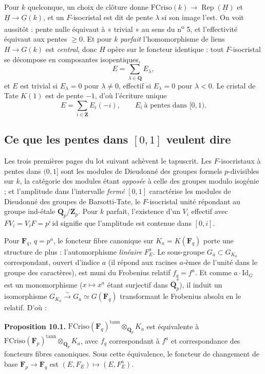\documentclass[11pt,a4paper]{article}
\begin{document}
Pour $k$ quelconque, un choix de clôture donne
$\mathrm{FCriso}(k) \to \operatorname{Rep}(\underline{H})$ et
$\underline{H} \to \underline{G}(k)$, et un $F$-isocristal est dit de pente
$\lambda$ si son image l'est. On voit aussitôt : pente nulle équivaut à
« trivial » au sens du n\textsuperscript{o} 5, et l'effectivité équivaut aux
pentes $\geqslant 0$. Et pour $k$ \emph{parfait} l'homomorphisme de liens
$H \to G(k)$ est \emph{central}, donc $H$ opère sur le foncteur identique :
tout $F$-isocristal se décompose en composantes isopentiques,
\[
E = \sum_{\lambda \in \mathbf{Q}} E_{\lambda} ,
\]
et $E$ est trivial si $E_{\lambda} = 0$ pour $\lambda \neq 0$, effectif si
$E_{\lambda} = 0$ pour $\lambda < 0$. Le cristal de Tate $K(1)$ est de pente
$-1$, d'où l'écriture unique
\[
E = \sum_{i \in \mathbf{Z}} E_{i}(-i) ,
\qquad E_{i} \ \text{à pentes dans } [0,1) .
\]

\subsection*{Ce que les pentes dans $[0,1]$ veulent dire}

Les trois premières pages du lot suivant achèvent le tapuscrit. Les
$F$-isocristaux à pentes dans $(0,1]$ sont les modules de Dieudonné
des groupes formels $p$-divisibles sur $k$, la catégorie des modules étant
\emph{opposée} à celle des groupes modulo isogénie ; et l'amplitude dans
l'intervalle \emph{fermé} $[0,1]$ caractérise les modules de Dieudonné des
groupes de Barsotti-Tate, le $F$-isocristal unité répondant au groupe ind-étale
$\mathbf{Q}_{p}/\mathbf{Z}_{p}$. Pour $k$ parfait, l'existence d'un $V_{i}$
effectif avec $FV_{i} = V_{i}F = p^{i}\,\mathrm{id}$ signifie que l'amplitude
est contenue dans $[0,i]$.

Pour $\mathbf{F}_{q}$, $q = p^{a}$, le foncteur fibre canonique sur
$K_{a} = K(\mathbf{F}_{q})$ porte une structure de plus : l'automorphisme
\emph{linéaire} $F_{E}^{a}$. Le sous-groupe $G_{a} \subset G_{K_{a}}$
correspondant, ouvert d'indice $a$ (il répond aux racines $a$-èmes de
l'unité dans le groupe des caractères), est muni du Frobenius relatif
$f_{q} = f^{a}$. Et comme $a \cdot \mathrm{Id}_{G}$ est un monomorphisme
($x \mapsto x^{a}$ étant surjectif dans $\bar{\mathbf{Q}}_{p}^{*}$), il induit
un isomorphisme $G_{K_{a}} \xrightarrow{\sim} G_{a} \simeq
G(\mathbf{F}_{q})$ transformant le Frobenius absolu en le relatif. D'où :

\textbf{Proposition 10.1.} $\mathrm{FCriso}(\mathbf{F}_{q})^{\mathrm{tann}}
\otimes_{\mathbf{Q}_{p}} K_{a}$ est équivalente à
$\mathrm{FCriso}(\mathbf{F}_{p})^{\mathrm{tann}} \otimes_{\mathbf{Q}_{p}}
K_{a}$, avec $f_{q}$ correspondant à $f^{a}$ et correspondance des foncteurs
fibres canoniques. Sous cette équivalence, le foncteur de changement de base
$\mathbf{F}_{p} \to \mathbf{F}_{q}$ est $(E, F_{E}) \mapsto (E, F_{E}^{a})$.
\end{document}
